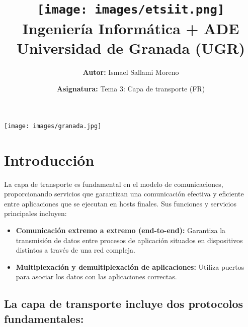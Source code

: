 \documentclass[a4paper,12pt]{article}
\title{
    \vspace{-2cm}
    \texttt{[image: images/etsiit.png]} \\ %
    \LARGE Ingeniería Informática + ADE\\
    \large Universidad de Granada (UGR)\\[1cm]
}
\author{\textbf{Autor:} Ismael Sallami Moreno}
\date{\textbf{Asignatura:} Tema 3: Capa de transporte (FR)\\[1cm]}
\begin{document}
\maketitle
\thispagestyle{empty}

\begin{center}
    \texttt{[image: images/granada.jpg]} \\ %
    \vfill
\end{center}

\newpage

\tableofcontents
\newpage


\section{Introducción}

La capa de transporte es fundamental en el modelo de comunicaciones, proporcionando servicios que garantizan una comunicación efectiva y eficiente entre aplicaciones que se ejecutan en hosts finales. Sus funciones y servicios principales incluyen:

\begin{itemize}
    \item \textbf{Comunicación extremo a extremo (end-to-end):} Garantiza la transmisión de datos entre procesos de aplicación situados en dispositivos distintos a través de una red compleja.
    \item \textbf{Multiplexación y demultiplexación de aplicaciones:} Utiliza puertos para asociar los datos con las aplicaciones correctas.
\end{itemize}

\subsection*{La capa de transporte incluye dos protocolos fundamentales:
}
\end{document}
